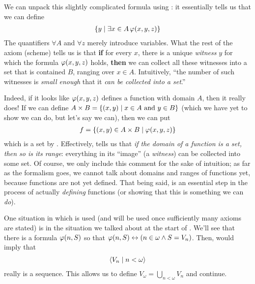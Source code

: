 We can unpack this slightly complicated formula using : it essentially tells us that we can define
\begin{align*}
    \left\{ y \; \middle\vert \; \exists x \in A \, \varphi\!\left( x, y, z \right) \right\}
\end{align*}
The quantifiers $\forall A$ and $\forall z$ merely introduce variables. What the rest of the axiom (scheme) tells us is that \textbf{if} for every $x$, there is a unique \textit{witness} $y$ for which the formula $\varphi\!\left( x, y, z \right)$ holds, \textbf{then} we can collect all these witnesses into a set that is contained $B$, ranging over $x \in A$. Intuitively, ``the number of such witnesses is \textit{small enough} that it \textit{can be collected into a set}.''

Indeed, if it looks like $\varphi\!\left( x, y, z \right)$ defines a function with domain $A$, then it really does! If we can define $A \times B = \left\{ \left( x, y \right) \; \middle\vert \; x \in A \text{ and } y \in B \right\}$ (which we have yet to show we can do, but let's say we can), then we can put
\begin{align*}
    f = \left\{ \left( x, y \right) \in A \times B \; \middle\vert \; \varphi\!\left( x, y, z \right) \right\}
\end{align*}
which is a set by . Effectively,  tells us that \textit{if the domain of a function is a set, then so is its range}: everything in its ``image'' (a \textit{witness}) can be collected into some set. Of course, we only include this comment for the sake of intuition; as far as the formalism goes, we cannot talk about domains and ranges of functions yet, because functions are not yet defined. That being said,  is an essential step in the process of actually \textit{defining} functions (or showing that this is something we can \textit{do}).

One situation in which  is used (and will be used once sufficiently many axioms are stated) is in the situation we talked about at the start of . We'll see that there is a formula $\varphi\!\left( n, S \right)$ so that $\varphi\!\left( n, S \right) \leftrightarrow \left( n \in \omega \land S = V_n \right)$. Then,  would imply that
\begin{align*}
    \left\langle V_n \; \middle| \; n < \omega \right\rangle
\end{align*}
really is a sequence. This allows us to define $V_\omega = \bigcup_{n < \omega} V_n$ and continue.

